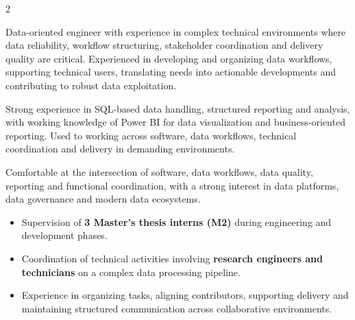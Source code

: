 \documentclass[8pt,a4paper,ragged2e,withhyper]{altacv}
\begin{document}
\begin{paracol}{2}
\switchcolumn


Data-oriented engineer with experience in complex technical environments where data reliability, workflow structuring, stakeholder coordination and delivery quality are critical. Experienced in developing and organizing data workflows, supporting technical users, translating needs into actionable developments and contributing to robust data exploitation.

Strong experience in SQL-based data handling, structured reporting and analysis, with working knowledge of Power BI for data visualization and business-oriented reporting. Used to working across software, data workflows, technical coordination and delivery in demanding environments.

Comfortable at the intersection of software, data workflows, data quality, reporting and functional coordination, with a strong interest in data platforms, data governance and modern data ecosystems.


\begin{itemize}
  \item Supervision of \textbf{3 Master’s thesis interns (M2)} during engineering and development phases.
  \item Coordination of technical activities involving \textbf{research engineers and technicians} on a complex data processing pipeline.
  \item Experience in organizing tasks, aligning contributors, supporting delivery and maintaining structured communication across collaborative environments.
\end{itemize}

\divider
{}
\divider

\medskip

\divider

\divider

\divider



\end{paracol}
\end{document}
